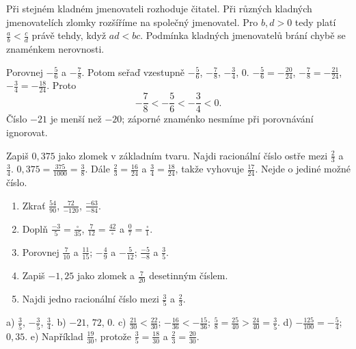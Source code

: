 \documentclass[11pt,a4paper]{article}
\begin{document}

\newpage
{}
Při stejném kladném jmenovateli rozhoduje čitatel. Při různých kladných
jmenovatelích zlomky rozšíříme na společný jmenovatel. Pro $b,d>0$
tedy platí $\frac ab<\frac cd$ právě tehdy, když $ad<bc$.
Podmínka kladných jmenovatelů brání chybě se znaménkem nerovnosti.

\begin{prikladReseniBox}[title={Příklad 5},breakable=false]
Porovnej $-\frac56$ a $-\frac78$. Potom seřaď vzestupně
$-\frac56$, $-\frac78$, $-\frac34$, $0$.
\tcblower
$-\frac56=-\frac{20}{24}$, $-\frac78=-\frac{21}{24}$,
$-\frac34=-\frac{18}{24}$. Proto
\[
-\frac78<-\frac56<-\frac34<0.
\]
Číslo $-21$ je menší než $-20$; záporné znaménko nesmíme při porovnávání ignorovat.
\end{prikladReseniBox}

\begin{prikladReseniBox}[title={Příklad 6},breakable=false]
Zapiš $0{,}375$ jako zlomek v základním tvaru.
Najdi racionální číslo ostře mezi $\frac23$ a $\frac34$.
\tcblower
$0{,}375=\frac{375}{1000}=\frac38$.
Dále $\frac23=\frac{16}{24}$ a $\frac34=\frac{18}{24}$,
takže vyhovuje $\frac{17}{24}$. Nejde o jediné možné číslo.
\end{prikladReseniBox}

\begin{zadaniReseniBox}[title={Samostatná práce 1},breakable=false]
\begin{enumerate}[label=\alph*)]
\item Zkrať $\frac{54}{90}$, $\frac{72}{-120}$, $\frac{-63}{-84}$.
\item Doplň $\frac{-3}{5}=\frac{\square}{35}$,
$\frac7{12}=\frac{42}{\square}$ a $\frac07=\frac{\square}{1}$.
\item Porovnej $\frac7{10}$ a $\frac{11}{15}$;
$-\frac49$ a $-\frac5{12}$; $\frac{-5}{-8}$ a $\frac35$.
\item Zapiš $-1{,}25$ jako zlomek a $\frac7{20}$ desetinným číslem.
\item Najdi jedno racionální číslo mezi $\frac35$ a $\frac23$.
\end{enumerate}
\tcblower
a) $\frac35$, $-\frac35$, $\frac34$.
b) $-21$, $72$, $0$.
c) $\frac{21}{30}<\frac{22}{30}$;
$-\frac{16}{36}<-\frac{15}{36}$;
$\frac58=\frac{25}{40}>\frac{24}{40}=\frac35$.
d) $-\frac{125}{100}=-\frac54$; $0{,}35$.
e) Například $\frac{19}{30}$, protože $\frac35=\frac{18}{30}$ a $\frac23=\frac{20}{30}$.
\end{zadaniReseniBox}
\end{document}
